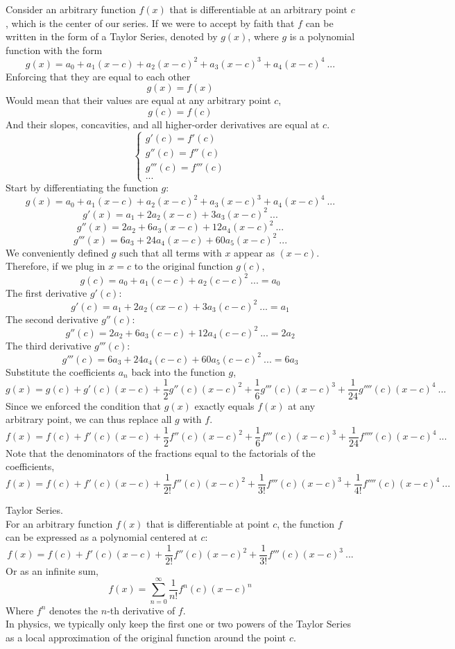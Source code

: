 \documentclass[11pt]{article}
\theoremstyle{gangnamstyle}{\newtheorem{definition}{Definition}[]}
\theoremstyle{gangnamstyle}{\newtheorem{example}{Example}[]}
\theoremstyle{gangnamstyle}{\newtheorem{problem}{Problem}[]}
\theoremstyle{gangnamstyle}{\newtheorem{warning}{Warning}[]}
\begin{document}
Consider an arbitrary function $f(x)$ that is differentiable at an arbitrary point $c$, which is the center of our series. If we were to accept by faith that $f$ can be written in the form of a Taylor Series, denoted by $g(x)$, where $g$ is a polynomial function with the form
\[ g(x) = a_0 + a_1(x - c) + a_2(x - c)^2 + a_3(x - c)^3 + a_4(x - c)^4 \ ... \]
Enforcing that they are equal to each other
\[ g(x) = f(x) \]
Would mean that their values are equal at any arbitrary point $c$, 
\[ g(c) = f(c) \]
And their slopes, concavities, and all higher-order derivatives are equal at $c$. 
\[ \begin{cases}
g'(c) = f'(c) \\
g''(c) = f''(c) \\
g'''(c) = f'''(c) \\
...
\end{cases} \]
Start by differentiating the function $g$: 
\[ g(x) = a_0 + a_1(x - c) + a_2(x - c)^2 + a_3(x - c)^3 + a_4(x - c)^4 \ ... \]
\[ g'(x) = a_1 + 2a_2(x - c) + 3a_3(x - c)^2 \ ... \]
\[ g''(x) = 2a_2 + 6a_3(x - c) + 12a_4(x - c)^2 \ ... \]
\[ g'''(x) = 6a_3 + 24a_4(x - c) + 60a_5(x - c)^2 \ ... \]
We conveniently defined $g$ such that all terms with $x$ appear as $(x - c)$. Therefore, if we plug in $x = c$ to the original function $g(c)$,
\[ g(c) = a_0 + a_1(c - c) + a_2(c - c)^2 \ ... = a_0 \]
The first derivative $g'(c)$:
\[ g'(c) = a_1 + 2a_2(cx - c) + 3a_3(c - c)^2 \ ... = a_1 \]
The second derivative $g''(c)$:
\[ g''(c) = 2a_2 + 6a_3(c - c) + 12a_4(c - c)^2 \ ... = 2a_2 \]
The third derivative $g'''(c)$:
\[ g'''(c) = 6a_3 + 24a_4(c - c) + 60a_5(c - c)^2 \ ... = 6a_3 \]
Substitute the coefficients $a_n$ back into the function $g$,
\[ g(x) = g(c) + g'(c)(x - c) + \frac{1}{2}g''(c)(x - c)^2 + \frac{1}{6}g'''(c)(x - c)^3 + \frac{1}{24}g''''(c)(x - c)^4 \ ... \]
Since we enforced the condition that $g(x)$ exactly equals $f(x)$ at any arbitrary point, we can thus replace all $g$ with $f$. 
\[ f(x) = f(c) + f'(c)(x - c) + \frac{1}{2}f''(c)(x - c)^2 + \frac{1}{6}f'''(c)(x - c)^3 + \frac{1}{24}f''''(c)(x - c)^4 \ ... \]
Note that the denominators of the fractions equal to the factorials of the coefficients, 
\[ f(x) = f(c) + f'(c)(x - c) + \frac{1}{2!}f''(c)(x - c)^2 + \frac{1}{3!}f'''(c)(x - c)^3 + \frac{1}{4!}f''''(c)(x - c)^4 \ ... \]

\begin{definition}
Taylor Series. \\
For an arbitrary function $f(x)$ that is differentiable at point $c$, the function $f$ can be expressed as a polynomial centered at $c$: 
\begin{equation}
f(x) = f(c) + f'(c)(x - c) + \frac{1}{2!}f''(c)(x - c)^2 + \frac{1}{3!}f'''(c)(x - c)^3 \ ...
\end{equation}
Or as an infinite sum, 
\begin{equation}
f(x) = \sum_{n = 0}^{\infty} \frac{1}{n!}f^n(c)(x - c)^n
\end{equation}
Where $f^n$ denotes the $n$-th derivative of $f$. \\
In physics, we typically only keep the first one or two powers of the Taylor Series as a local approximation of the original function around the point $c$. 
\end{definition}
\end{document}

